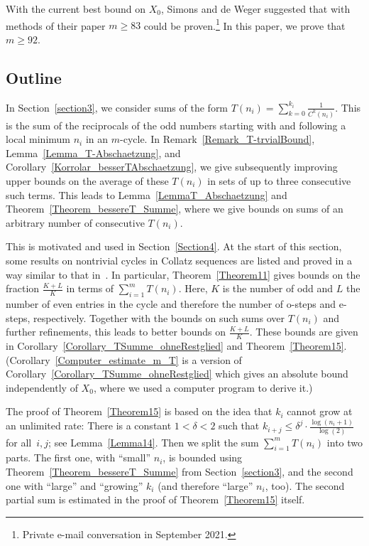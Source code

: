 \documentclass[12pt,reqno]{article}
\begin{document}
With the current best bound on $X_0$, Simons and de Weger
\cite{SW,SW-www} suggested that with methods of their paper $m \geq 83$
could be proven.\footnote{Private e-mail conversation in September 2021.}
In this paper, we prove that $m \geq 92$.

\subsection{Outline}
In Section~\ref{section3}, we consider sums of the form $T(n_i)=\sum_{k=0}^{k_i} \tfrac{1}{C^k(n_i)}$. This is the sum of the reciprocals of the odd numbers starting with and following a local minimum $n_i$ in an $m$-cycle. In Remark~\ref{Remark_T-trvialBound}, Lemma~\ref{Lemma_T-Abschaetzung}, and Corollary~\ref{Korrolar_besserTAbschaetzung}, we give subsequently improving upper bounds on the average of these $T(n_i)$ in sets of up to three consecutive such terms. This leads to Lemma~\ref{LemmaT_Abschaetzung} and Theorem~\ref{Theorem_bessereT_Summe}, where we give bounds on sums of an arbitrary number of consecutive $T(n_i)$.

This is motivated and used in Section~\ref{Section4}. At the start of this section, some results on nontrivial cycles in Collatz sequences are listed and proved in a way similar to that in~\cite{SE,SW,He}. In particular, Theorem~\ref{Theorem11} gives bounds on the fraction $\tfrac{K+L}{K}$ in terms of $\sum_{i=1}^m T(n_i)$. Here, $K$ is the number of odd and $L$ the number of even entries in the cycle and therefore the number of o-steps and e-steps, respectively. Together with the bounds on such sums over $T(n_i)$ and further refinements, this leads to better bounds on $\tfrac{K+L}{K}$. These bounds are given in Corollary~\ref{Corollary_TSumme_ohneRestglied} and Theorem~\ref{Theorem15}. (Corollary~\ref{Computer_estimate_m_T} is a version of Corollary~\ref{Corollary_TSumme_ohneRestglied} which gives an absolute bound independently of $X_0$, where we used a computer program to derive it.) 

The proof of Theorem~\ref{Theorem15} is based on the idea that $k_i$ cannot grow at an unlimited rate: There is a constant $1<\delta<2$ such that $k_{i+j}\leq \delta^j \cdot \tfrac{\log (n_i+1)}{\log (2)}$ for all~$i, j$; see Lemma~\ref{Lemma14}. Then we split the sum $\sum_{i=1}^m T(n_i)$ into two parts. The first one, with ``small'' $n_i$, is bounded using Theorem~\ref{Theorem_bessereT_Summe} from Section~\ref{section3}, and the second one with ``large'' and ``growing'' $k_i$ (and therefore ``large'' $n_i$, too). The second partial sum is estimated in the proof of Theorem~\ref{Theorem15} itself.
\end{document}
